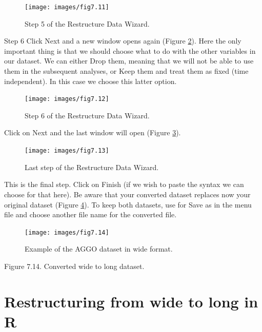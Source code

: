 \documentclass[
]{book}
\begin{document}
\begin{figure}

{\centering \texttt{[image: images/fig7.11]} 

}

\caption{Step 5 of the Restructure Data Wizard.}\label{fig:fig81}
\end{figure}

Step 6
Click Next and a new window opens again (Figure \ref{fig:fig82}). Here the only important thing is that we should choose what to do with the other variables in our dataset. We can either Drop them, meaning that we will not be able to use them in the subsequent analyses, or Keep them and treat them as fixed (time independent). In this case we choose this latter option.

\begin{figure}

{\centering \texttt{[image: images/fig7.12]} 

}

\caption{Step 6 of the Restructure Data Wizard.}\label{fig:fig82}
\end{figure}

Click on Next and the last window will open (Figure \ref{fig:fig83}).

\begin{figure}

{\centering \texttt{[image: images/fig7.13]} 

}

\caption{Last step of the Restructure Data Wizard.}\label{fig:fig83}
\end{figure}

This is the final step. Click on Finish (if we wish to paste the syntax we can choose for that here). Be aware that your converted dataset replaces now your original dataset (Figure \ref{fig:fig84}). To keep both datasets, use for Save as in the menu file and choose another file name for the converted file.

\begin{figure}

{\centering \texttt{[image: images/fig7.14]} 

}

\caption{Example of the AGGO dataset in wide format.}\label{fig:fig84}
\end{figure}

Figure 7.14. Converted wide to long dataset.

\hypertarget{restructuring-from-wide-to-long-in-r}{%
\section{Restructuring from wide to long in R}\label{restructuring-from-wide-to-long-in-r}}
\end{document}
